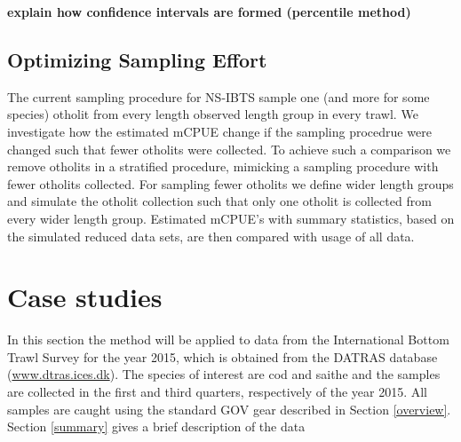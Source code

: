 \documentclass[a4paper 12pt]{article}
\numberwithin{equation}{section}
\begin{document}
{\bf explain how confidence intervals are formed (percentile method)}

\subsection{Optimizing Sampling Effort}
\label{sec:optimizationsampling}




The current sampling procedure for NS-IBTS sample one (and more for some species) otholit from every length observed length group in every trawl. We investigate how the estimated mCPUE change if the sampling procedrue were changed such that fewer otholits were collected. To achieve such a comparison we remove otholits in a stratified procedure, mimicking a sampling procedure with fewer otholits collected. For sampling fewer otholits we define wider length groups and simulate the otholit collection such that only one otholit is collected from every wider length group. Estimated mCPUE's with summary statistics, based on the simulated reduced data sets, are then compared with usage of all data. 


\section{Case studies}
\label{sec:data}
In this section the method will be applied to data from the International Bottom Trawl Survey for the year 2015, which is obtained from the DATRAS database (\url{www.dtras.ices.dk}). The species of interest are cod and saithe and the samples are collected in the first and third quarters, respectively of the year 2015. All samples are caught using the standard GOV gear described in Section \ref{overview}. Section \ref{summary} gives a brief description of the data \\
\end{document}
